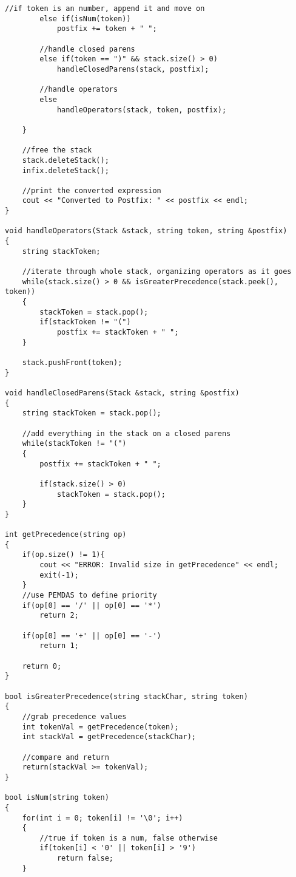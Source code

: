 \begin{lstlisting}[style=cppstyle, caption={stack.cpp}]
        //if token is an number, append it and move on
        else if(isNum(token))
            postfix += token + " ";

        //handle closed parens
        else if(token == ")" && stack.size() > 0)
            handleClosedParens(stack, postfix);

        //handle operators
        else
            handleOperators(stack, token, postfix);

    }

    //free the stack
    stack.deleteStack();
    infix.deleteStack();

    //print the converted expression
    cout << "Converted to Postfix: " << postfix << endl;
}

void handleOperators(Stack &stack, string token, string &postfix)
{
    string stackToken;

    //iterate through whole stack, organizing operators as it goes
    while(stack.size() > 0 && isGreaterPrecedence(stack.peek(), token))
    {
        stackToken = stack.pop();
        if(stackToken != "(")
            postfix += stackToken + " ";
    }

    stack.pushFront(token);
}

void handleClosedParens(Stack &stack, string &postfix)
{
    string stackToken = stack.pop();

    //add everything in the stack on a closed parens
    while(stackToken != "(")
    {
        postfix += stackToken + " ";

        if(stack.size() > 0)
            stackToken = stack.pop();
    }
}

int getPrecedence(string op)
{
    if(op.size() != 1){
        cout << "ERROR: Invalid size in getPrecedence" << endl;
        exit(-1);
    }
    //use PEMDAS to define priority
    if(op[0] == '/' || op[0] == '*')
        return 2;

    if(op[0] == '+' || op[0] == '-')
        return 1;

    return 0;
}

bool isGreaterPrecedence(string stackChar, string token)
{
    //grab precedence values
    int tokenVal = getPrecedence(token);
    int stackVal = getPrecedence(stackChar);

    //compare and return
    return(stackVal >= tokenVal);
}

bool isNum(string token)
{
    for(int i = 0; token[i] != '\0'; i++)
    {
        //true if token is a num, false otherwise
        if(token[i] < '0' || token[i] > '9')
            return false;
    }


\end{lstlisting}
